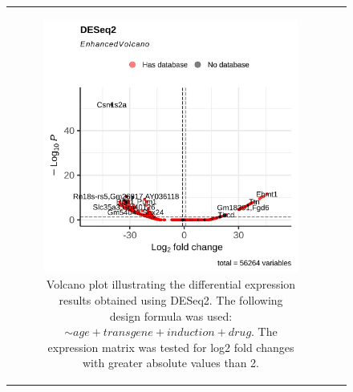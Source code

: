 \begin{figure}[H] \begin{tabular}{cc} \begin{subfigure}{0.5\textwidth}
                 \centering

                 \includegraphics[width=\linewidth]{chapters/4_results_and_discussion/figures/dea/deseq2/tamoxifen/volcano.png}
                 \caption{Volcano plot illustrating the differential expression
                     results obtained
                     using DESeq2.
                     The following design formula was used: $\sim age + transgene + induction +
                         drug$.
                     The expression matrix was tested for log2 fold changes with greater absolute
                     values than 2.
                 }
                 \label{fig:tamoxifen_volcano_deseq2}
             \end{subfigure}
        \begin{subfigure}{0.5\textwidth}
            \centering


\end{subfigure}
\end{tabular}
\end{figure}
